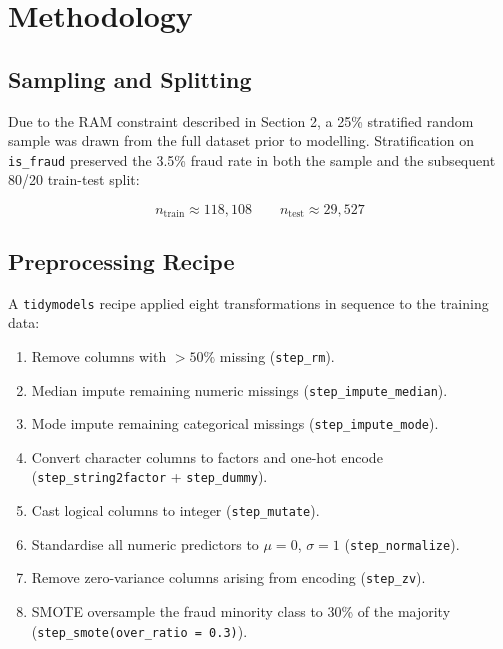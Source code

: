 \documentclass[12pt, a4paper]{article}
\begin{document}
\section{Methodology}

\subsection{Sampling and Splitting}

Due to the RAM constraint described in Section 2, a 25\% stratified random sample
was drawn from the full dataset prior to modelling. Stratification on
\texttt{is\_fraud} preserved the 3.5\% fraud rate in both the sample and the
subsequent 80/20 train-test split:

\begin{equation}
    n_{\text{train}} \approx 118{,}108 \qquad n_{\text{test}} \approx 29{,}527
\end{equation}

\subsection{Preprocessing Recipe}

A \texttt{tidymodels} recipe applied eight transformations in sequence to the
training data:

\begin{enumerate}
    \item Remove columns with $>50\%$ missing (\texttt{step\_rm}).
    \item Median impute remaining numeric missings (\texttt{step\_impute\_median}).
    \item Mode impute remaining categorical missings (\texttt{step\_impute\_mode}).
    \item Convert character columns to factors and one-hot encode
    (\texttt{step\_string2factor} + \texttt{step\_dummy}).
    \item Cast logical columns to integer (\texttt{step\_mutate}).
    \item Standardise all numeric predictors to $\mu=0$, $\sigma=1$
    (\texttt{step\_normalize}).
    \item Remove zero-variance columns arising from encoding (\texttt{step\_zv}).
    \item SMOTE oversample the fraud minority class to 30\% of the majority
    (\texttt{step\_smote(over\_ratio = 0.3)}).
\end{enumerate}
\end{document}
